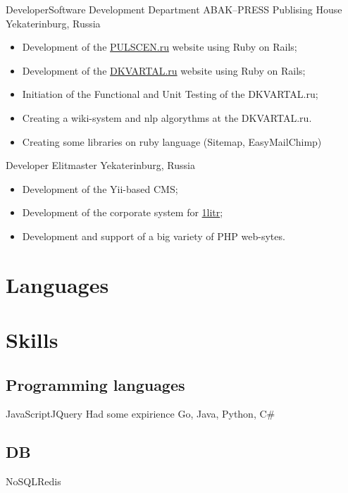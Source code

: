 \documentclass[11pt,a4paper]{moderncv}
\begin{document}
  {Developer}{Software Development Department}
  {ABAK--PRESS Publising House}
  {Yekaterinburg, Russia}
{
\begin{itemize}
  \item Development of the \href{http://pulscen.ru}{PULSCEN.ru} website using Ruby on Rails;
  \item Development of the \href{http://dkvartal.ru}{DKVARTAL.ru} website using Ruby on Rails;
  \item Initiation of the Functional and Unit Testing of the {DKVARTAL.ru};
  \item Creating a wiki-system and nlp algorythms at the {DKVARTAL.ru}.
  \item Creating some libraries on ruby language (Sitemap, EasyMailChimp)
\end{itemize}
}

\cvitem {}{}

  {Developer}{}
  {Elitmaster}
  {Yekaterinburg, Russia}
{
\begin{itemize}
  \item Development of the Yii-based CMS;
  \item Development of the corporate system for \href{1litr.elitmaster.com}{1litr};
  \item Development and support of a big variety of PHP web-sytes.
\end{itemize}
}


\section{Languages}

\section{Skills}

\subsection{Programming languages}
{JavaScript}{JQuery}
\cvcomputer
{Had some expirience} {Go, Java, Python, C\#}
{}{}

\subsection{DB}
           {NoSQL}{Redis}
\end{document}
